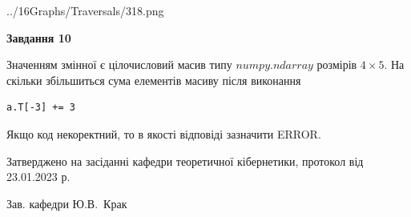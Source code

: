 \documentclass[12pt, ukrainian]{article}
\begin{document}
{\begin {large}
\begin{center}
	{../16Graphs/Traversals/318.png}
\end{center}\par
\newpage

{\begin {center}\textbf{Завдання 10}\end {center}}\par
Значенням змінної  є цілочисловий масив типу $numpy.ndarray$ розмірів $4{\times}5$. На скільки збільшиться сума елементів масиву  після виконання
\begin{verbatim}
a.T[-3] += 3
\end{verbatim}


Якщо код некоректний, то в якості відповіді зазначити ERROR.\par
\newpage


\end {large}
}
{\smallskip \begin {small} Затверджено на засіданні кафедри теоретичної кібернетики, протокол  від   23.01.2023 р.\par\smallskip\smallskip
{\parbox {6.5 cm}{Зав. кафедри \dotfill Ю.В.~Крак}} \end{small}}
\end{document}
